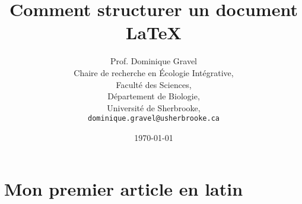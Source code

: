 \documentclass[12pt]{article}
\title{Comment structurer un document \LaTeX{}}
\author{Prof. Dominique Gravel\\
   Chaire de recherche en Écologie Intégrative,\\
   Faculté des Sciences,\\
   Département de Biologie,\\
   Université de Sherbrooke,\\
   \texttt{dominique.gravel@usherbrooke.ca}}
\date{\today}
\begin{document}
\maketitle

\begin{abstract}
\lipsum[1]
\end{abstract}

\section{Mon premier article en latin}
\lipsum[2-4]
\end{document}
